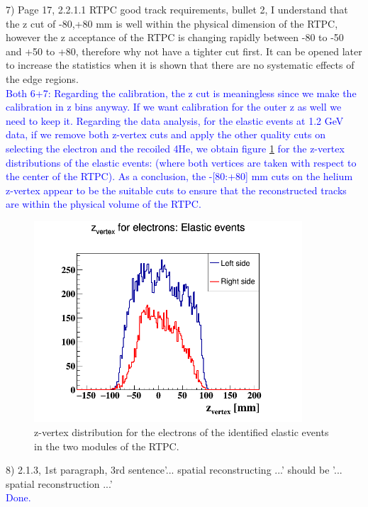 7) Page 17, 2.2.1.1 RTPC good track requirements, bullet 2, I understand that 
the z cut of -80,+80 mm is well within the physical dimension of the RTPC,  
however the z  acceptance of the RTPC is changing rapidly between -80 to -50 
and +50 to +80, therefore why not have a  tighter cut first. It can be opened 
later to increase the statistics when it is shown that there are no systematic 
effects of the edge regions. \\
\textcolor{blue}{
 Both 6+7: Regarding the calibration, the z cut is meaningless since we make 
 the calibration in z bins anyway. If we want calibration for the outer z as 
 well we need to keep it. Regarding the data analysis, for the elastic events 
 at 1.2 GeV data, if we remove both z-vertex cuts and apply the other quality 
 cuts on selecting the electron and the recoiled 4He, we obtain figure 
 \ref{fig:elastic_z_vertex} for the z-vertex distributions of the elastic 
 events: (where both vertices are taken with respect to the center of the 
 RTPC).  As a conclusion, the -[80:+80] mm cuts on the helium z-vertex appear 
 to be the suitable cuts to ensure that the reconstructed tracks are within the 
 physical volume of the RTPC.}\\
\begin{figure}[tbp]
\centering
\includegraphics[height=7.5cm]{fig/elastic_z_vertex.png}
\caption{z-vertex distribution for the electrons of the identified elastic 
events in the two modules of the RTPC.}
\label{fig:elastic_z_vertex}
 \end{figure}

8) 2.1.3, 1st paragraph, 3rd sentence'... spatial reconstructing ...' should be 
'...  spatial reconstruction ...' \\
\textcolor{blue}{ Done.} \\


